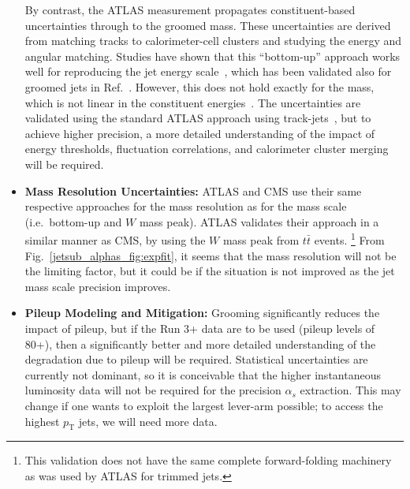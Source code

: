 \documentclass[11pt]{cernrep}
\begin{document}
\begin{itemize}
By contrast, the ATLAS measurement propagates constituent-based uncertainties through to the groomed mass.
%
These uncertainties are derived from matching tracks to calorimeter-cell clusters and studying the energy and angular matching.
%
Studies have shown that this ``bottom-up'' approach works well for reproducing the jet energy scale~\cite{Aaboud:2016hwh}, which has been validated also for groomed jets in Ref.~\cite{Aaboud:2017qwh}.
%
However, this does not hold exactly for the mass, which is not linear in the constituent energies~\cite{Nachman:2016qyc}.
%
The uncertainties are validated using the standard ATLAS approach using track-jets~\cite{Aad:2013gja,ATLAS-CONF-2017-063}, but to achieve higher precision, a more detailed understanding of the impact of energy thresholds, fluctuation correlations, and calorimeter cluster merging will be required.
%
\item {\bf Mass Resolution Uncertainties:} ATLAS and CMS use their same respective approaches for the mass resolution as for the mass scale (i.e.\ bottom-up and $W$ mass peak).
%
ATLAS validates their approach in a similar manner as CMS, by using the $W$ mass peak from $t\bar{t}$ events.%
\footnote{This validation does not have the same complete forward-folding machinery as was used by ATLAS for trimmed jets.}
%
From Fig.~\ref{jetsub_alphas_fig:expfit}, it seems that the mass resolution will not be the limiting factor, but it could be if the situation is not improved as the jet mass scale precision improves.
%
\item {\bf Pileup Modeling and Mitigation:} Grooming significantly reduces the impact of pileup, but if the Run 3+ data are to be used (pileup levels of 80+), then a significantly better and more detailed understanding of the degradation due to pileup will be required.
%
Statistical uncertainties are currently not dominant, so it is conceivable that the higher instantaneous luminosity data will not be required for the precision $\alpha_s$ extraction.
%
This may change if one wants to exploit the largest lever-arm possible; to access the highest $p_{\mathrm{T}}$ jets, we will need more data.
%
\end{itemize}
\end{document}
